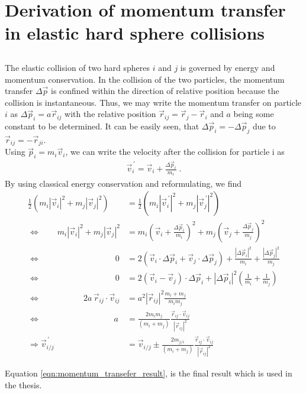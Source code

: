 
\label{sec:appendix}
\chapter{Derivation of momentum transfer in elastic hard sphere collisions}
\section*{}
The elastic collision of two hard spheres $i$ and $j$ is governed by energy and momentum conservation.
In the collision of the two particles, the momentum transfer $\Delta \vec{p}$ is confined within the direction of relative position because the collision is instantaneous. Thus, we may write the momentum transfer on particle $i$ as $\Delta \vec{p}_i = a \vec{r}_{ij}$ with the relative position $\vec{r}_{ij} = \vec{r}_{j} -\vec{r}_{i} $ and $a$ being some constant to be determined. It can be easily seen, that $\Delta \vec{p}_i = - \Delta \vec{p}_j$ due to $\vec{r}_{ij} = -\vec{r}_{ji}$. \\

Using $\vec{p}_i = m_i \vec{v}_i$, we can write the velocity after the collision for particle i as
\begin{align}
\vec{v}_i^{\,'} = \vec{v}_i +\frac{\Delta \vec{p}_i } {m_i} \; \text{.}
\end{align}
By using classical energy conservation and reformulating, we find
\begin{align}
\label{eqn:momentum_transfer}
\frac{1}{2}\left( m_i |\vec{v}_i|^2 + m_j |\vec{v}_j|^2 \right) &= \frac{1}{2}\left( m_i |\vec{v}_i^{\,'}|^2 + m_j |\vec{v}_j^{\,'}|^2 \right) \\
\Leftrightarrow \qquad  m_i |\vec{v}_i|^2 + m_j |\vec{v}_j|^2  &= m_i \left(  \vec{v}_i +\frac{\Delta \vec{p}_i } {m_i} \right)^2 + m_ j\left(  \vec{v}_j +\frac{\Delta \vec{p}_j } {m_j} \right)^2 \\
\Leftrightarrow \qquad\qquad\qquad\qquad\quad\! 0 &= 2 \left(  \vec{v}_i \cdot  \Delta \vec{p}_i  +\vec{v}_j \cdot  \Delta \vec{p}_j   \right)+\frac{|\Delta \vec{p}_i|^2 } {m_i} +\frac{|\Delta \vec{p}_j|^2 } {m_j}\\
\Leftrightarrow  \qquad\qquad\qquad\qquad\quad\! 0 &= 2 (\vec{v}_i - \vec{v}_j)\cdot \Delta \vec{p}_i + |\Delta \vec{p}_i|^2 \left(\frac{1}{m_i} +\frac{1}{m_j} \right)\\
 \Leftrightarrow \qquad\qquad\quad\, 2 a \, \vec{r}_{ij} \cdot \vec{v}_{ij} &= a^2 |\vec{r}_{ij}|^2 \frac{m_i + m_j}{m_i m_j}\\
 \Leftrightarrow\qquad\qquad\qquad\qquad\;\;\; a &= \frac{2 m_i m_j }{(m_i + m_j)  } \frac{\vec{r}_{ij} \cdot \vec{v}_{ij}}{|\vec{r}_{ij}|^2}\\
\label{eqn:momentum_transefer_result}
\Rightarrow \vec{v}_{i/j}^{\,'} &= \vec{v}_{i/j} \pm \frac{2 m_{j/i} }{(m_i + m_j)  } \frac{\vec{r}_{ij} \cdot \vec{v}_{ij}}{|\vec{r}_{ij}|^2}
\end{align}

Equation \ref{eqn:momentum_transefer_result}, is the final result which is used in the thesis.
